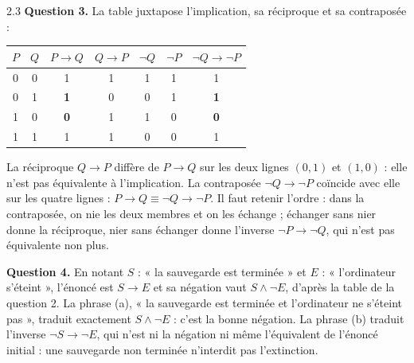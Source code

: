 \begin{corrige}{2.3}
\textbf{Question 3.} La table juxtapose l'implication, sa réciproque et sa contraposée :

\begin{center}
\begin{tabular}{cc|cc|ccc}
\toprule
\rowcolor{robleuf}$P$ & $Q$ & $P \rightarrow Q$ & $Q \rightarrow P$ & $\lnot Q$ & $\lnot P$ & $\lnot Q \rightarrow \lnot P$ \\
\midrule
0 & 0 & 1 & 1 & 1 & 1 & 1 \\
\rowcolor{rogrisf!50}0 & 1 & \textbf{1} & 0 & 0 & 1 & \textbf{1} \\
1 & 0 & \textbf{0} & 1 & 1 & 0 & \textbf{0} \\
\rowcolor{rogrisf!50}1 & 1 & 1 & 1 & 0 & 0 & 1 \\
\bottomrule
\end{tabular}
\end{center}
La réciproque $Q \rightarrow P$ diffère de $P \rightarrow Q$ sur les deux lignes $(0, 1)$ et $(1, 0)$ : elle n'est pas équivalente à l'implication. La contraposée $\lnot Q \rightarrow \lnot P$ coïncide avec elle sur les quatre lignes : $P \rightarrow Q \equiv \lnot Q \rightarrow \lnot P$. Il faut retenir l'ordre : dans la contraposée, on nie les deux membres et on les échange ; échanger sans nier donne la réciproque, nier sans échanger donne l'inverse $\lnot P \rightarrow \lnot Q$, qui n'est pas équivalente non plus.

\textbf{Question 4.} En notant $S$ : « la sauvegarde est terminée » et $E$ : « l'ordinateur s'éteint », l'énoncé est $S \rightarrow E$ et sa négation vaut $S \land \lnot E$, d'après la table de la question 2. La phrase (a), « la sauvegarde est terminée et l'ordinateur ne s'éteint pas », traduit exactement $S \land \lnot E$ : c'est la bonne négation. La phrase (b) traduit l'inverse $\lnot S \rightarrow \lnot E$, qui n'est ni la négation ni même l'équivalent de l'énoncé initial : une sauvegarde non terminée n'interdit pas l'extinction.
\end{corrige}

